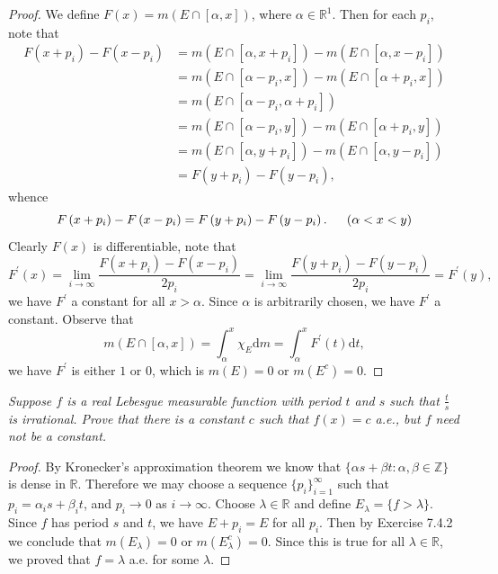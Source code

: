 \begin{proof}
We define $F(x)=m(E\cap[\alpha,x])$, where $\alpha\in\mathbb{R}^1$. Then for each $p_i$, note that 
$$
\begin{aligned}
F\left( x+p_i \right) -F\left( x-p_i \right) &=m\left( E\cap \left[ \alpha ,x+p_i \right] \right) -m\left( E\cap \left[ \alpha ,x-p_i \right] \right) 
\\
&=m\left( E\cap \left[ \alpha -p_i,x \right] \right) -m\left( E\cap \left[ \alpha +p_i,x \right] \right) 
\\
&=m\left( E\cap \left[ \alpha -p_i,\alpha +p_i \right] \right) 
\\
&=m\left( E\cap \left[ \alpha -p_i,y \right] \right) -m\left( E\cap \left[ \alpha +p_i,y \right] \right) 
\\
&=m\left( E\cap \left[ \alpha ,y+p_i \right] \right) -m\left( E\cap \left[ \alpha ,y-p_i \right] \right) 
\\
&=F\left( y+p_i \right) -F\left( y-p_i \right) ,
\end{aligned}
$$
whence 
$$
F\left( x+p_i \right) -F\left( x-p_i \right) =F\left( y+p_i \right) -F\left( y-p_i \right) .\hspace{0.5cm}\left( \alpha <x<y \right) 
$$
Clearly $F(x)$ is differentiable, note that 
$$
F^{\prime}\left( x \right) =\lim_{i\rightarrow \infty} \frac{F\left( x+p_i \right) -F\left( x-p_i \right)}{2p_i}=\lim_{i\rightarrow \infty} \frac{F\left( y+p_i \right) -F\left( y-p_i \right)}{2p_i}=F^{\prime}\left( y \right) ,
$$
we have $F^\prime$ a constant for all $x>\alpha$. Since $\alpha$ is arbitrarily chosen, we have $F^\prime$ a constant. Observe that 
$$
m\left( E\cap \left[ \alpha ,x \right] \right) =\int_{\alpha}^x{\chi _E\mathrm{d}m}=\int_{\alpha}^x{F^{\prime}\left( t \right) \mathrm{d}t},
$$
we have $F^\prime$ is either $1$ or $0$, which is $m(E)=0$ or $m(E^c)=0$.
\end{proof}
\begin{problem}\em
Suppose $f$ is a real Lebesgue measurable function with period $t$ and $s$ such that $\frac{t}{s}$ is irrational. Prove that there is a constant $c$ such that $f(x)=c$ a.e., but $f$ need not be a constant.
\end{problem}
\begin{proof}
By Kronecker's approximation theorem we know that $\{\alpha s+\beta t:\alpha,\beta\in\mathbb{Z}\}$ is dense in $\mathbb{R}$. Therefore we may choose a sequence $\{p_i\}_{i=1}^\infty$ such that $p_i=\alpha_is+\beta_it$, and $p_i\to 0$ as $i\to\infty$. Choose $\lambda\in\mathbb{R}$ and define $E_\lambda=\{f>\lambda\}$. Since $f$ has period $s$ and $t$, we have $E+p_i=E$ for all $p_i$. Then by Exercise 7.4.2 we conclude that $m(E_\lambda)=0$ or $m(E_\lambda^c)=0$. Since this is true for all $\lambda\in\mathbb{R}$, we proved that $f=\lambda$ a.e. for some $\lambda$.
\end{proof}
